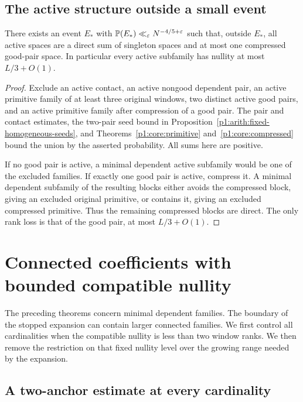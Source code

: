 \subsection{The active structure outside a small event}

\begin{lemma}
\label{p1:core:exceptional}
There exists an event $E_*$ with
$\P(E_*)\ll_\varepsilon N^{-4/5+\varepsilon}$ such that, outside
$E_*$, all active spaces are a direct sum of singleton spaces and at
most one compressed good-pair space. In particular every active
subfamily has nullity at most $L/3+O(1)$.
\end{lemma}
\begin{proof}
Exclude an active contact, an active nongood dependent pair, an active
primitive family of at least three original windows, two distinct
active good pairs, and an active primitive family after compression of
a good pair. The pair and contact estimates, the two-pair seed bound in
Proposition~\ref{p1:arith:fixed-homogeneous-seeds}, and
Theorems~\ref{p1:core:primitive} and~\ref{p1:core:compressed}
bound the union by the asserted probability. All sums here are positive.

If no good pair is active, a minimal dependent active subfamily would
be one of the excluded families. If exactly one good pair is active,
compress it. A minimal dependent subfamily of the resulting blocks
either avoids the compressed block, giving an excluded original
primitive, or contains it, giving an excluded compressed primitive.
Thus the remaining compressed blocks are direct. The only rank loss
is that of the good pair, at most $L/3+O(1)$.
\end{proof}

\section{Connected coefficients with bounded compatible nullity}
\label{p1:core:nullity-section}

The preceding theorems concern minimal dependent families. The
boundary of the stopped expansion can contain larger connected
families. We first control all cardinalities when the compatible
nullity is less than two window ranks. We then remove the restriction
on that fixed nullity level over the growing range needed by the
expansion.

\subsection{A two-anchor estimate at every cardinality}

